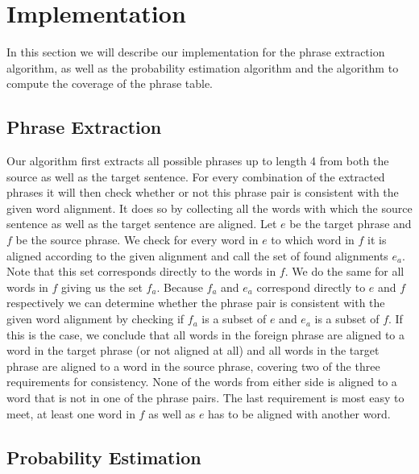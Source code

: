 \documentclass[11pt]{article}
\begin{document}
\section{Implementation}
In this section we will describe our implementation for the phrase extraction algorithm, as well as the probability estimation algorithm and the algorithm to compute the coverage of the phrase table. 

\subsection{Phrase Extraction}
\label{implem1}
Our algorithm first extracts all possible phrases up to length 4 from both the source as well as the target sentence. For every combination of the extracted phrases it will then check whether or not this phrase pair is consistent with the given word alignment. It does so by collecting all the words with which the source sentence as well as the target sentence are aligned. Let $e$ be the target phrase and $f$ be the source phrase. We check for every word in $e$ to which word in $f$ it is aligned according to the given alignment and call the set of found alignments $e_a$. Note that this set corresponds directly to the words in $f$. We do the same for all words in $f$ giving us the set $f_a$. Because $f_a$ and $e_a$ correspond directly to $e$ and $f$ respectively we can determine whether the phrase pair is consistent with the given word alignment by checking if $f_a$ is a subset of $e$ and $e_a$ is a subset of $f$. If this is the case, we conclude that all words in the foreign phrase are aligned to a word in the target phrase (or not aligned at all) and all words in the target phrase are aligned to a word in the source phrase, covering two of the three requirements for consistency. None of the words from either side is aligned to a word that is not in one of the phrase pairs. The last requirement is most easy to meet, at least one word in $f$ as well as $e$ has to be aligned with another word.

\subsection{Probability Estimation}
\label{implem3}
\end{document}
